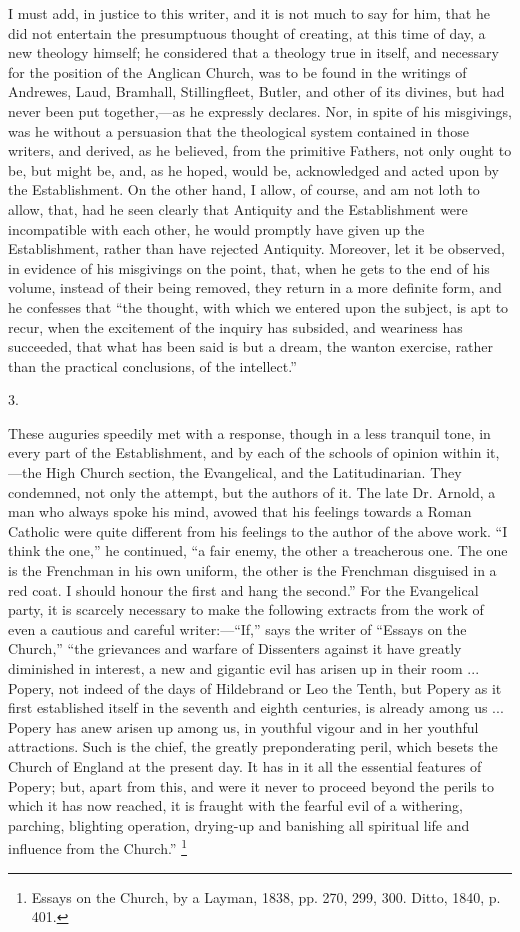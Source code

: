 I must add, in justice to this writer, and it is not much to say
for him, that he did not entertain the presumptuous thought of
creating, at this time of day, a new theology himself; he considered
that a theology true in itself, and necessary for the position of the
Anglican Church, was to be found in the writings of Andrewes, Laud,
Bramhall, Stillingfleet, Butler, and other of its divines, but had
never been put together,—as he expressly declares. Nor, in spite of
his misgivings, was he without a persuasion that the theological
system contained in those writers, and derived, as he believed, from
the primitive Fathers, not only ought to be, but might be, and, as he
hoped, would be, acknowledged and acted upon by the Establishment. On
the other hand, I allow, of course, and am not loth to allow, that,
had he seen clearly that Antiquity and the Establishment were
incompatible with each other, he would promptly have given up the
Establishment, rather than have rejected Antiquity. Moreover, let it
be observed, in evidence of his misgivings on the point, that, when he
gets to the end of his volume, instead of their being removed, they
return in a more definite form, and he confesses that ``the
thought, with which we entered upon the subject, is apt to recur, when
the excitement of the inquiry has subsided, and weariness has
succeeded, that what has been said is but a dream, the wanton
exercise, rather than the practical conclusions, of the
intellect.''

3.

These auguries speedily met with a response, though in a less
tranquil tone, in every part of the Establishment, and by each of the
schools of opinion within it,—the High Church section, the
Evangelical, and the Latitudinarian. They condemned, not only the
attempt, but the authors of it. The late Dr. Arnold, a man who always
spoke his mind, avowed that his feelings towards a Roman Catholic were
quite different from his feelings to the author of the above work.
``I think the one,'' he continued, ``a fair enemy, the
other a treacherous one. The one is the Frenchman in his own uniform,
the other is the Frenchman disguised in a red coat. I should honour
the first and hang the second.'' For the Evangelical party, it is
scarcely necessary to make the following extracts from the work of
even a cautious and careful writer:—``If,'' says the writer
of ``Essays on the Church,'' ``the grievances and warfare
of Dissenters against it have greatly diminished in interest, a new
and gigantic evil has arisen up in their room ... Popery, not indeed
of the days of Hildebrand or Leo the Tenth, but Popery as it first
established itself in the seventh and eighth centuries, is already
among us ... Popery has anew arisen up among us, in youthful vigour
and in her youthful attractions. Such is the chief, the greatly
preponderating peril, which besets the Church of England at the
present day. It has in it all the essential features of Popery; but,
apart from this, and were it never to proceed beyond the perils to
which it has now reached, it is fraught with the fearful evil of a
withering, parching, blighting operation, drying-up and banishing all
spiritual life and influence from the Church.'' \footnote{Essays on the Church, by a Layman, 1838, pp.
270, 299, 300. Ditto, 1840, p. 401.}

